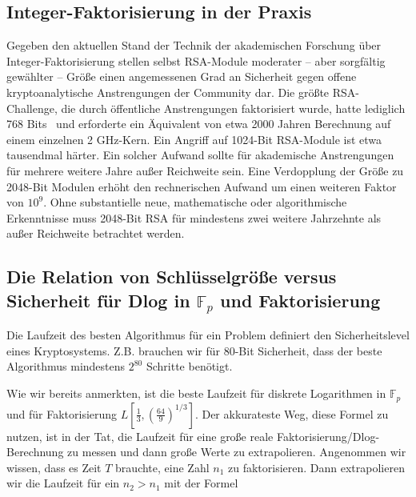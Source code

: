\begin{refsegment}
\subsection{Integer-Faktorisierung in der Praxis}

Gegeben den aktuellen Stand der Technik der akademischen Forschung über Integer-Faktori\-sierung
stellen selbst RSA-Module moderater -- aber sorgfältig gewählter -- Größe einen angemessenen Grad an Sicherheit gegen offene kryptoanalytische Anstrengungen der Community dar. Die größte RSA-Challenge, die durch öffentliche Anstrengungen faktorisiert wurde, hatte lediglich 768 Bits~\cite{factor768_2010} und erforderte ein Äquivalent von etwa 2000 Jahren Berechnung auf einem einzelnen 2 GHz-Kern. Ein Angriff auf 1024-Bit RSA-Module ist etwa tausendmal härter. Ein solcher Aufwand sollte für akademische Anstrengungen für mehrere weitere Jahre außer Reichweite sein. Eine Verdopplung der Größe zu 2048-Bit Modulen erhöht den rechnerischen Aufwand um einen weiteren Faktor von $10^9$. Ohne substantielle neue, mathematische oder algorithmische Erkenntnisse muss 2048-Bit RSA für mindestens zwei weitere Jahrzehnte als außer Reichweite betrachtet werden.


\subsection{\texorpdfstring{Die Relation von Schlüsselgröße versus Sicherheit für Dlog in $\mathbb{F}_p$ und Faktorisierung}{Die Relation von Schlüsselgröße versus Sicherheit für Dlog in Fp und Faktorisierung}}
\label{key-size-factoring}

Die Laufzeit des besten Algorithmus für ein Problem definiert den Sicherheitslevel eines Kryptosystems. Z.B. brauchen wir für 80-Bit Sicherheit, dass der beste Algorithmus
mindestens $2^{80}$ Schritte benötigt.

Wie wir bereits anmerkten, ist die beste Laufzeit für diskrete Logarithmen in $\mathbb{F}_p$ und für Faktorisierung $L[\frac 1 3,\left(\frac{64}{9}\right)^{1/3}]$. Der akkurateste Weg, diese Formel zu nutzen, ist in der Tat, die Laufzeit für eine große reale Faktorisierung/Dlog-Berechnung zu messen und dann große Werte zu extrapolieren. Angenommen wir wissen, dass es Zeit $T$ brauchte, eine Zahl $n_1$ zu faktorisieren. Dann extrapolieren wir die Laufzeit für ein $n_2 > n_1$ mit der Formel


\end{refsegment}
